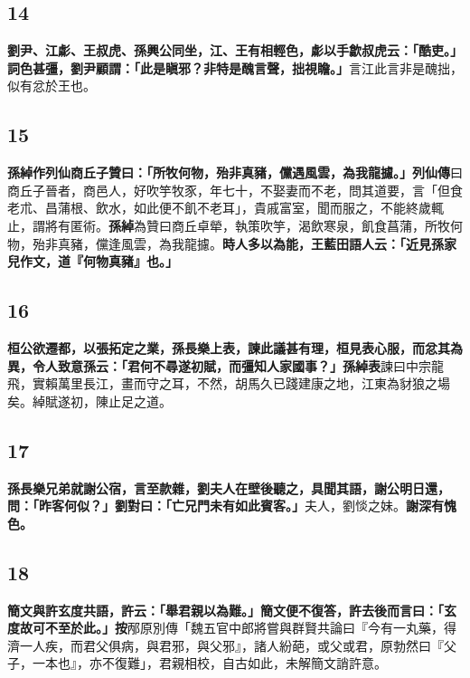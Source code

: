 \subsection*{14}

\textbf{劉尹、江虨、王叔虎、孫興公同坐，江、王有相輕色，虨以手歙叔虎云：「酷吏。」詞色甚彊，劉尹顧謂：「此是瞋邪？非特是醜言聲，拙視瞻。」}{\footnotesize 言江此言非是醜拙，似有忿於王也。}

\subsection*{15}

\textbf{孫綽作列仙商丘子贊曰：「所牧何物，殆非真豬，儻遇風雲，為我龍攄。」}{\footnotesize \textbf{列仙傳}曰商丘子晉者，商邑人，好吹竽牧豕，年七十，不娶妻而不老，問其道要，言「但食老朮、昌蒲根、飲水，如此便不飢不老耳」，貴戚富室，聞而服之，不能終歲輒止，謂將有匿術。\textbf{孫綽}為贊曰商丘卓犖，執策吹竽，渴飲寒泉，飢食菖蒲，所牧何物，殆非真豬，儻逢風雲，為我龍攄。}\textbf{時人多以為能，王藍田語人云：「近見孫家兒作文，道『何物真豬』也。」}

\subsection*{16}

\textbf{桓公欲遷都，以張拓定之業，孫長樂上表，諫此議甚有理，桓見表心服，而忿其為異，令人致意孫云：「君何不尋遂初賦，而彊知人家國事？」}{\footnotesize \textbf{孫綽表}諫曰中宗龍飛，實賴萬里長江，畫而守之耳，不然，胡馬久已踐建康之地，江東為豺狼之場矣。綽賦遂初，陳止足之道。}

\subsection*{17}

\textbf{孫長樂兄弟就謝公宿，言至款雜，劉夫人在壁後聽之，具聞其語，謝公明日還，問：「昨客何似？」劉對曰：「亡兄門未有如此賓客。」}{\footnotesize 夫人，劉惔之妹。}\textbf{謝深有愧色。}

\subsection*{18}

\textbf{簡文與許玄度共語，許云：「舉君親以為難。」簡文便不復答，許去後而言曰：「玄度故可不至於此。」}{\footnotesize \textbf{按}邴原別傳「魏五官中郎將嘗與群賢共論曰『今有一丸藥，得濟一人疾，而君父俱病，與君邪，與父邪』，諸人紛葩，或父或君，原勃然曰『父子，一本也』，亦不復難」，君親相校，自古如此，未解簡文誚許意。}

